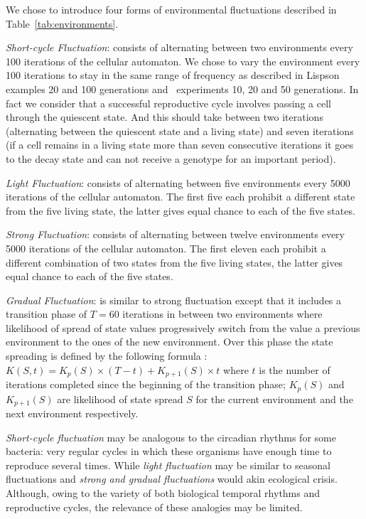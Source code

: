 \documentclass[letterpaper]{article}
\begin{document}
We chose to introduce four forms of environmental fluctuations described in Table~\ref{tab:environments}.

\noindent \emph{Short-cycle Fluctuation}: consists of alternating between two environments every 100 iterations of the cellular automaton. We chose to vary the environment every 100 iterations to stay in the same range of frequency as described in Lispson~\citep{lipson2002origin} examples 20 and 100 generations and~\citep{yu2007program} experiments 10, 20 and 50 generations. In fact we consider that a successful reproductive cycle involves passing a cell through the quiescent state. And this should take between two iterations (alternating between the quiescent state and a living state) and seven iterations (if a cell remains in a living state more than seven consecutive iterations it goes to the decay state and can not receive a genotype for an important period).

\noindent \emph{Light Fluctuation}: consists of alternating between five environments every 5000 iterations of the cellular automaton. The first five each prohibit a different state from the five living state, the latter gives equal chance to each of the five states.

\noindent \emph{Strong Fluctuation}: consists of alternating between twelve environments every 5000 iterations of the cellular automaton. The first eleven each prohibit a different combination of two states from the five living states, the latter gives equal chance to each of the five states.

\noindent \emph{Gradual Fluctuation}: is similar to strong fluctuation except that it includes a transition phase of $T=60$ iterations in between two environments where likelihood of spread of state values progressively switch from the value a previous environment to the ones of the new environment. Over this phase the state spreading is defined by the following formula : $K(S,t)=K_p(S) \times (T-t) + K_{p+1}(S) \times t$ where $t$ is the number of iterations completed since the beginning of the transition phase; $K_p(S)$ and $K_{p+1}(S)$ are likelihood of state spread $S$ for the current environment and the next environment respectively.

\emph{Short-cycle fluctuation} may be analogous to the circadian rhythms for some bacteria: very regular cycles in which these organisms have enough time to reproduce several times. While \emph{light fluctuation} may be similar to seasonal fluctuations and \emph{strong and gradual fluctuations} would akin ecological crisis. Although, owing to the variety of both biological temporal rhythms and reproductive cycles, the relevance of these analogies may be limited. 
\end{document}
